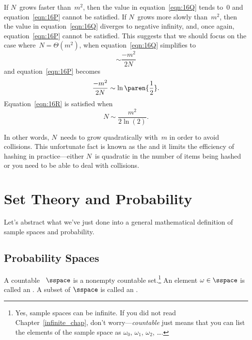 If $N$~grows faster than~$m^2$, then the value in
equation~\eqref{eqn:16Q} tends to~0 and equation~\eqref{eqn:16P}
cannot be satisfied.  If $N$~grows more slowly than~$m^2$, then the
value in equation~\eqref{eqn:16Q} diverges to negative infinity, and,
once again, equation~\eqref{eqn:16P} cannot be satisfied.  This suggests
that we should focus on the case where~$N = \Theta(m^2)$, when
equation~\eqref{eqn:16Q} simplifies to
\begin{equation*}
    \sim \frac{-m^2}{2N}
\end{equation*}
and equation~\eqref{eqn:16P} becomes
\begin{equation}\label{eqn:16R}
    \frac{-m^2}{2N} \sim \ln\paren{\frac{1}{2}}.
\end{equation}
Equation~\eqref{eqn:16R} is satisfied when
\begin{equation}\label{eqn:16S}
    N \sim \frac{m^2}{2 \ln(2)}.
\end{equation}

In other words, $N$~needs to grow quadratically with~$m$ in order to
avoid collisions.  This unfortunate fact is known as the
 and it limits the efficiency of hashing in
practice---either $N$~is quadratic in the number of items being hashed
or you need to be able to deal with collisions.

\fi



\section{Set Theory and Probability}\label{probability_sets_sec}

Let's abstract what we've just done into a general mathematical
definition of sample spaces and probability.

\subsection{Probability Spaces}

\begin{definition}\label{LN12:sampsp}
  A countable ~$\sspace$ is a nonempty countable
  set.\footnote{Yes, sample spaces can be infinite.  If you did not
    read Chapter~\ref{infinite_chap}, don't worry---\emph{countable}
    just means that you can list the elements of the sample space as
    $\omega_0$, $\omega_1$, $\omega_2$, \dots.}  An element $\omega
  \in \sspace$ is called an .  A subset of $\sspace$ is
  called an .
\end{definition}

